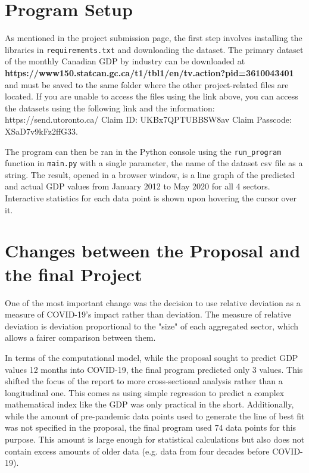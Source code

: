 \documentclass[fontsize=11pt]{article}
\begin{document}
\section*{Program Setup}

As mentioned in the project submission page, the first step involves installing the libraries in \texttt{requirements.txt} and downloading the dataset. The primary dataset of the monthly Canadian GDP by industry can be downloaded at \textbf{https://www150.statcan.gc.ca/t1/tbl1/en/tv.action?pid=3610043401} and must be saved to the same folder where the other project-related files are located. If you are unable to access the files using the link above, you can access the datasets using the following link and the information: https://send.utoronto.ca/ Claim ID: UKBx7QPTUBBSW8av Claim Passcode: XSaD7v9kFz2ffG33.

The program can then be ran in the Python console using the \texttt{run\_program} function in \texttt{main.py} with a single parameter, the name of the dataset csv file as a string. The result, opened in a browser window, is a line graph of the predicted and actual GDP values from January 2012 to May 2020 for all 4 sectors. Interactive statistics for each data point is shown upon hovering the cursor over it.


\section*{Changes between the Proposal and the final Project}

One of the most important change was the decision to use relative deviation as a measure of COVID-19's impact rather than deviation. The measure of relative deviation is deviation proportional to the "size" of each aggregated sector, which allows a fairer comparison between them.

In terms of the computational model, while the proposal sought to predict GDP values 12 months into COVID-19, the final program predicted only 3 values. This shifted the focus of the report to more cross-sectional analysis rather than a longitudinal one. This comes as using simple regression to predict a complex mathematical index like the GDP was only practical in the short. Additionally, while the amount of pre-pandemic data points used to generate the line of best fit was not specified in the proposal, the final program used 74 data points for this purpose. This amount is large enough for statistical calculations but also does not contain excess amounts of older data (e.g. data from four decades before COVID-19). 
\end{document}
